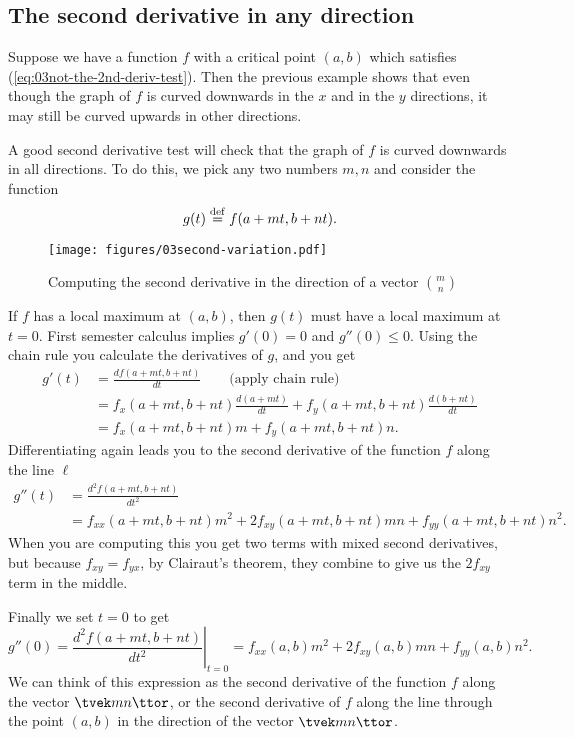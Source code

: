\subsection{The second derivative in any direction} 
\label{sec:second-deriv-in-any-direction}
Suppose we have a function $f$ with a critical point $(a,b)$ which
satisfies (\ref{eq:03not-the-2nd-deriv-test}).  Then the previous
example shows that even though the graph of $f$ is curved downwards in
the $x$ and in the $y$ directions, it may still be curved upwards in
other directions.

A good second derivative test will check that the graph of $f$ is
curved downwards in all directions.  To do this, we pick any two
numbers $m,n$ and consider the function
\begin{equation}
  \label{eq:function-on-line-through-cpt}
  g(t) \stackrel{\rm def}{=} f(a+mt, b+nt).
\end{equation}

\begin{figure}[b]
  \centering
  \texttt{[image: figures/03second-variation.pdf]}
  \caption{Computing the second derivative in the direction of a
  vector $\binom mn$}
  \label{fig:second-variation}
\end{figure}

If $f$ has a local maximum at $(a,b)$, then $g(t)$ must have a local
maximum at $t=0$.  First semester calculus implies $g'(0) = 0$ and
$g''(0)\leq 0$.  Using the chain rule you calculate the derivatives of
$g$, and you get
\begin{align*}
  g'(t) &= \frac{d f(a+mt, b+nt)}{dt} \qquad\text{(apply chain rule)}\\
  &= f_x(a+mt, b+nt) \frac{d (a+mt)}{dt}
  + f_y(a+mt, b+nt) \frac{d (b+nt)}{dt}\\
  &=  f_x(a+mt, b+nt) m + f_y(a+mt, b+nt) n.
\end{align*}
Differentiating again leads you to the second derivative of the
function $f$ along the line $\ell$
\begin{align*}
  g''(t) &= \frac{d^2 f(a+mt, b+nt)}{dt^2} \\
  & = f_{xx}(a+mt, b+nt) m^2 + 2
  f_{xy}(a+mt, b+nt) mn + f_{yy}(a+mt, b+nt) n^2.
\end{align*}
When you are computing this you get two terms with mixed second
derivatives, but because $f_{xy} = f_{yx}$, by Clairaut's theorem,
they combine to give us the $2f_{xy}$ term in the middle.

Finally we set $t=0$ to get
\begin{equation}
  g''(0) = \left.\frac{d^2 f(a+mt, b+nt)}{dt^2}\right|_{t=0} =
  f_{xx}(a,b) m^2 + 2f_{xy}(a,b) mn + f_{yy}(a,b)n^2.
  \label{eq:second-variation}
\end{equation}
We can think of this expression as the second derivative of the function
$f$ along the vector $\tvek m\\n\ttor$, or the second derivative of $f$
along the line through the point $(a,b)$ in the direction of the vector
$\tvek m\\n\ttor$.

